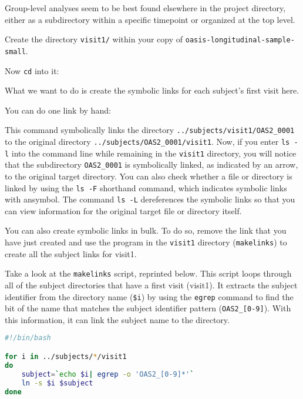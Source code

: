 Group-level analyses seem to be best found elsewhere in the project
directory, either as a subdirectory within a specific timepoint or organized at the top
level.

Create the directory \texttt{visit1/} within your copy of \texttt{oasis-longitudinal-sample-small}. 

Now \texttt{cd} into it:

What we want to do is create the symbolic links for each subject's first visit here. 

You can do one link by hand:

This command symbolically links the directory \texttt{../subjects/visit1/OAS2_0001} to the original directory \texttt{../subjects/OAS2_0001/visit1}. 
Now, if you enter \texttt{ls -l} into the command line while remaining in the \texttt{visit1} directory, you will notice that the subdirectory \texttt{OAS2_0001} is symbolically linked, as indicated by an arrow, to the original target directory. You can also check whether a file or directory is linked by using the \texttt{ls -F} shorthand command, which indicates symbolic links with an\@ symbol. The command \texttt{ls -L} dereferences the symbolic links so that you can view information for the original target file or directory itself.

You can also create symbolic links in bulk. To do so, remove the link that you have just created and
use the program in the \texttt{visit1} directory (\texttt{makelinks}) to create all the subject links for visit1. 

Take a look at the \texttt{makelinks} script, reprinted below. This script loops through all of the subject directories that have a first visit (visit1). It extracts the subject identifier from the directory name (\texttt{\$i}) by using the \texttt{egrep} command to find the bit of the name that matches the subject identifier pattern (\texttt{OAS2_[0-9]}). With this information, it can link the subject name to the directory. 

\begin{lstlisting}[basicstyle=\ttfamily,frame=single,language=bash]
#!/bin/bash

for i in ../subjects/*/visit1
do
	subject=`echo $i| egrep -o 'OAS2_[0-9]*'` 
	ln -s $i $subject
done
\end{lstlisting}

